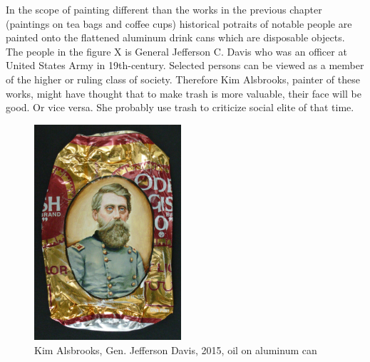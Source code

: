 

In the scope of painting different than the works in the previous chapter (paintings on tea bags and coffee cups) historical potraits of notable people are painted onto the flattened aluminum drink cans which are disposable objects. The people in the figure X is General Jefferson C. Davis who was an officer at United States Army in 19th-century. Selected persons can be viewed as a member of the higher or ruling class of society. Therefore Kim Alsbrooks, painter of these works, might have thought that to make trash is more valuable, their face will be good. Or vice versa. She probably use trash to criticize social elite of that time. 

\begin{figure}[h!]
  \centering
  \includegraphics[height=8cm]{graphics/Alsbrooks.jpg}
  \caption{Kim Alsbrooks, Gen. Jefferson Davis, 2015, oil on aluminum can}
  \label{fig:Alsbrooks}
\end{figure}

